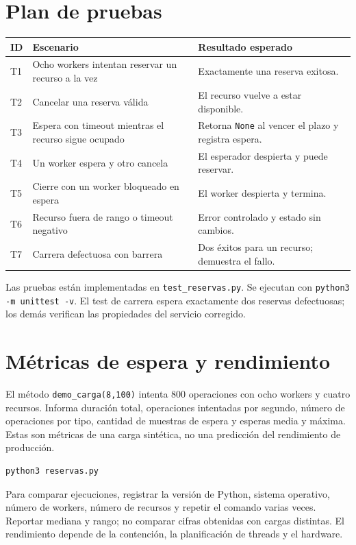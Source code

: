 \documentclass[12pt,a4paper]{article}
\begin{document}
\section{Plan de pruebas}
\begin{table}[H]\centering\small
\begin{tabularx}{\linewidth}{p{1.1cm}X X}
\toprule
\textbf{ID} & \textbf{Escenario} & \textbf{Resultado esperado}\\\midrule
T1 & Ocho workers intentan reservar un recurso a la vez & Exactamente una reserva exitosa.\\
T2 & Cancelar una reserva válida & El recurso vuelve a estar disponible.\\
T3 & Espera con timeout mientras el recurso sigue ocupado & Retorna \texttt{None} al vencer el plazo y registra espera.\\
T4 & Un worker espera y otro cancela & El esperador despierta y puede reservar.\\
T5 & Cierre con un worker bloqueado en espera & El worker despierta y termina.\\
T6 & Recurso fuera de rango o timeout negativo & Error controlado y estado sin cambios.\\
T7 & Carrera defectuosa con barrera & Dos éxitos para un recurso; demuestra el fallo.\\
\bottomrule
\end{tabularx}\end{table}
Las pruebas están implementadas en \texttt{test\_reservas.py}. Se ejecutan con \texttt{python3 -m unittest -v}. El test de carrera espera exactamente dos reservas defectuosas; los demás verifican las propiedades del servicio corregido.
\section{Métricas de espera y rendimiento}
El método \texttt{demo\_carga(8,100)} intenta 800 operaciones con ocho workers y cuatro recursos. Informa duración total, operaciones intentadas por segundo, número de operaciones por tipo, cantidad de muestras de espera y esperas media y máxima. Estas son métricas de una carga sintética, no una predicción del rendimiento de producción.
\begin{lstlisting}[style=console]
python3 reservas.py
\end{lstlisting}
Para comparar ejecuciones, registrar la versión de Python, sistema operativo, número de workers, número de recursos y repetir el comando varias veces. Reportar mediana y rango; no comparar cifras obtenidas con cargas distintas. El rendimiento depende de la contención, la planificación de threads y el hardware.
\newpage
\end{document}
